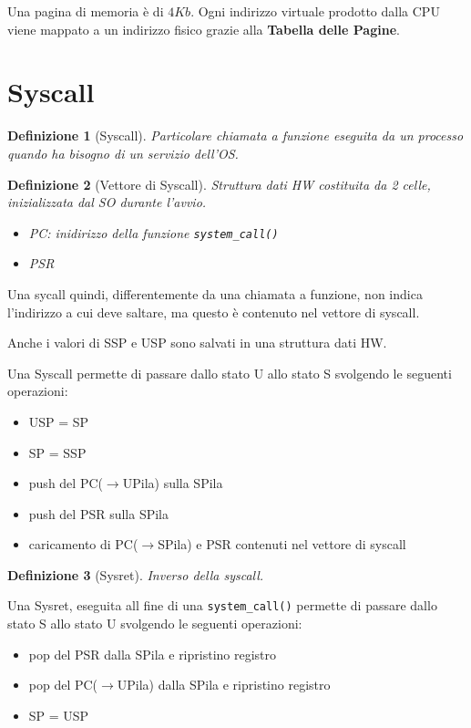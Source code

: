 \documentclass[12pt, a4paper]{report}
\newtheorem{definition}{Definizione}
\begin{document}
Una pagina di memoria è di $4Kb$. Ogni indirizzo virtuale prodotto dalla CPU
viene mappato a un indirizzo fisico grazie alla \textbf{Tabella delle Pagine}.

\section{Syscall}
\begin{definition}[Syscall]
	Particolare chiamata a funzione eseguita da un processo quando ha bisogno
	di un servizio dell'OS.
\end{definition}
\begin{definition}[Vettore di Syscall]
	Struttura dati HW costituita da 2 celle, inizializzata dal SO durante
	l'avvio.
	\begin{itemize}
		\item PC: inidirizzo della funzione \texttt{system\_call()}
		\item PSR
	\end{itemize}
\end{definition}
Una sycall quindi, differentemente da una chiamata a funzione, non indica
l'indirizzo a cui deve saltare, ma questo è contenuto nel vettore di syscall.

Anche i valori di SSP e USP sono salvati in una struttura dati HW.

Una Syscall permette di passare dallo stato U allo stato S svolgendo le seguenti
operazioni:
\begin{itemize}
	\item USP = SP
	\item SP = SSP
	\item push del PC($\to$UPila) sulla SPila
	\item push del PSR sulla SPila
	\item caricamento di PC($\to$SPila) e PSR contenuti nel vettore di syscall
\end{itemize}

\begin{definition}[Sysret]
	Inverso della syscall.
\end{definition}
Una Sysret, eseguita all fine di una \texttt{system\_call()} permette di passare
dallo stato S allo stato U svolgendo le seguenti operazioni:
\begin{itemize}
	\item pop del PSR dalla SPila e ripristino registro
	\item pop del PC($\to$UPila) dalla SPila e ripristino registro
	\item SP = USP
\end{itemize}
\end{document}
